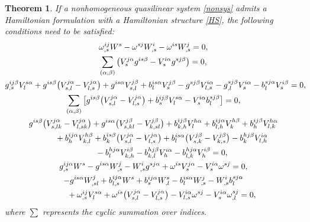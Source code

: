 \documentclass[10pt,a4paper]{amsart}
\numberwithin{equation}{section}
\newtheorem{Theorem}{Theorem}[section]
\begin{document}
\begin{Theorem}\label{theorem8}
If a nonhomogeneous quasilinear system \eqref{nonsys} admits a Hamiltonian formulation with a Hamiltonian structure \eqref{HS}, the following conditions need to be satisfied:
\begin{subequations}
\begin{gather}
\omega^{ij}_{,s}W^s-\omega^{sj}W^i_{,s}-\omega^{is}W^j_{,s}=0,\label{syscon1}\\
\sum_{(\alpha,\beta)}\big(V^{j\alpha}_sg^{is\beta}-V^{i\alpha}_sg^{sj\beta}\big)=0,\label{syscon2}\\
g^{ij\beta}_{,s}V^{s\alpha}_l+g^{is\beta}\big(V^{j\alpha}_{s,l}\!-V^{j\alpha}_{l,s}\big)+g^{is\alpha}V^{j\beta}_{s,l}
+b^{is\alpha}_lV^{j\beta}_s-g^{sj\beta}V^{i\alpha}_{l,s}-g^{sj\beta}_{,l}V^{i\alpha}_s-b^{sj\alpha}_lV^{i\beta}_s
=0,\!\!\!\label{syscon3}\\
\sum_{(\alpha,\beta)}\big[g^{is\beta}\big(V^{j\alpha}_{s,l}-V^{j\alpha}_{l,s}\big)+b^{ij\beta}_sV^{s\alpha}_l-V^{i\alpha}_sb^{sj\beta}_l\big]=0,\label{syscon4}\\
g^{is\beta}\big(V^{j\alpha}_{s,lk}-V^{j\alpha}_{l,sk}\big)+g^{is\alpha}\big(V^{j\beta}_{s,kl}-V^{j\beta}_{k,sl}\big)+b^{ij\beta}_{k,h}V^{h\alpha}_l+b^{ij\alpha}_{l,h}V^{h\beta}_k +b^{ij\beta}_hV^{h\alpha}_{l,k}\notag \\
\qquad{}+b^{ij\alpha}_hV^{h\beta}_{k,l}+b^{is\beta}_k\big(V^{j\alpha}_{s,l}
-V^{j\alpha}_{l,s}\big)+b^{is\alpha}_l\big(V^{j\beta}_{s,k}-V^{j\beta}_{k,s}\big) -b^{hj\beta}_kV^{i\alpha}_{l,h}\notag \\
\qquad{}
-b^{hj\alpha}_lV^{i\beta}_{k,h}-b^{hj\beta}_{k,l}V^{i\alpha}_h-b^{hj\alpha}_{l,k}V^{i\beta}_h=0,\label{syscon5}\\
g^{ij\alpha}_{,s}W^s-g^{is\alpha}W^j_{,s}-W^i_{,s}g^{sj\alpha}+\omega^{is}V^{j\alpha}_s-V^{i\alpha}_s\omega^{sj}=0,\label{syscon6}\\
-g^{is\alpha}W^j_{,sl}+b^{ij\alpha}_{l,s}W^s+b^{ij\alpha}_sW^s_{,l}-b^{is\alpha}_lW^j_{,s}-W^i_{,s}b^{sj\alpha}_l \notag \\
\qquad{}+\omega^{ij}_{,s}V^{s\alpha}_l+\omega^{is}\big(V^{j\alpha}_{s,l}-V^{j\alpha}_{l,s}\big)-V^{i\alpha}_{l,s}\omega^{sj}-V^{i\alpha}_s\omega^{sj}_{,l}=0,\label{syscon7}
\end{gather}
\end{subequations}
where $\sum$ represents the cyclic summation over indices.
\end{Theorem}
\end{document}
